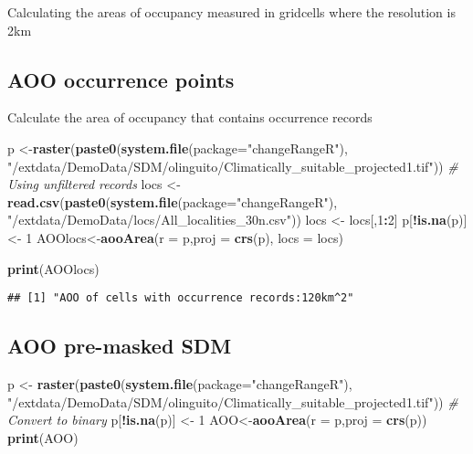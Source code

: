 \documentclass[
]{article}
\newenvironment{Shaded}{\begin{snugshade}}{\end{snugshade}}
\newcommand{\CommentTok}[1]{\textcolor[rgb]{0.56,0.35,0.01}{\textit{#1}}}
\newcommand{\DataTypeTok}[1]{\textcolor[rgb]{0.13,0.29,0.53}{#1}}
\newcommand{\DecValTok}[1]{\textcolor[rgb]{0.00,0.00,0.81}{#1}}
\newcommand{\KeywordTok}[1]{\textcolor[rgb]{0.13,0.29,0.53}{\textbf{#1}}}
\newcommand{\NormalTok}[1]{#1}
\newcommand{\OperatorTok}[1]{\textcolor[rgb]{0.81,0.36,0.00}{\textbf{#1}}}
\newcommand{\StringTok}[1]{\textcolor[rgb]{0.31,0.60,0.02}{#1}}
\begin{document}
Calculating the areas of occupancy measured in gridcells where the
resolution is 2km

\hypertarget{aoo-occurrence-points}{%
\subsection{AOO occurrence points}\label{aoo-occurrence-points}}

Calculate the area of occupancy that contains occurrence records

\begin{Shaded}
\begin{Highlighting}[]
\NormalTok{p <-}\KeywordTok{raster}\NormalTok{(}\KeywordTok{paste0}\NormalTok{(}\KeywordTok{system.file}\NormalTok{(}\DataTypeTok{package=}\StringTok{"changeRangeR"}\NormalTok{), }\StringTok{"/extdata/DemoData/SDM/olinguito/Climatically_suitable_projected1.tif"}\NormalTok{))}
\CommentTok{# Using unfiltered records}
\NormalTok{locs <-}\StringTok{ }\KeywordTok{read.csv}\NormalTok{(}\KeywordTok{paste0}\NormalTok{(}\KeywordTok{system.file}\NormalTok{(}\DataTypeTok{package=}\StringTok{"changeRangeR"}\NormalTok{), }\StringTok{"/extdata/DemoData/locs/All_localities_30n.csv"}\NormalTok{))}
\NormalTok{locs <-}\StringTok{ }\NormalTok{locs[,}\DecValTok{1}\OperatorTok{:}\DecValTok{2}\NormalTok{]}
\NormalTok{p[}\OperatorTok{!}\KeywordTok{is.na}\NormalTok{(p)] <-}\StringTok{ }\DecValTok{1}
\NormalTok{AOOlocs<-}\KeywordTok{aooArea}\NormalTok{(}\DataTypeTok{r =}\NormalTok{ p,}\DataTypeTok{proj =} \KeywordTok{crs}\NormalTok{(p), }\DataTypeTok{locs =}\NormalTok{ locs)}

\KeywordTok{print}\NormalTok{(AOOlocs)}
\end{Highlighting}
\end{Shaded}

\begin{verbatim}
## [1] "AOO of cells with occurrence records:120km^2"
\end{verbatim}

\hypertarget{aoo-pre-masked-sdm}{%
\subsection{AOO pre-masked SDM}\label{aoo-pre-masked-sdm}}

\begin{Shaded}
\begin{Highlighting}[]
\NormalTok{p <-}\StringTok{ }\KeywordTok{raster}\NormalTok{(}\KeywordTok{paste0}\NormalTok{(}\KeywordTok{system.file}\NormalTok{(}\DataTypeTok{package=}\StringTok{"changeRangeR"}\NormalTok{), }\StringTok{"/extdata/DemoData/SDM/olinguito/Climatically_suitable_projected1.tif"}\NormalTok{))}
\CommentTok{# Convert to binary}
\NormalTok{p[}\OperatorTok{!}\KeywordTok{is.na}\NormalTok{(p)] <-}\StringTok{ }\DecValTok{1}
\NormalTok{AOO<-}\KeywordTok{aooArea}\NormalTok{(}\DataTypeTok{r =}\NormalTok{ p,}\DataTypeTok{proj =} \KeywordTok{crs}\NormalTok{(p))}
\KeywordTok{print}\NormalTok{(AOO)}
\end{Highlighting}
\end{Shaded}
\end{document}
